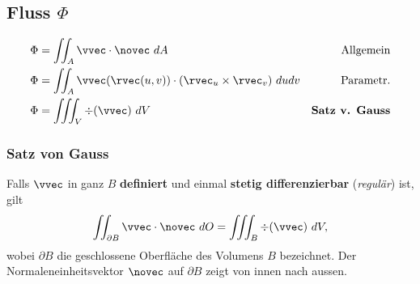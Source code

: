 \subsection{Fluss \hfill $\Phi$}
    \vspace{-1em}
    \begin{align*}
        \Phi &= \iint_A \vvec \cdot \novec \ dA &\textrm{Allgemein}\\
        \Phi &= \iint_A \vvec(\rvec(u,v)) \cdot (\rvec_u \times \rvec_v) \ du dv &\textrm{Parametr.}\\
        \Phi &= \iiint_V \div(\vvec) \ dV &\textbf{Satz\ v. Gauss}
    \end{align*}

    \subsubsection{Satz von Gauss}
        Falls $\vvec$ in ganz $B$ \textbf{definiert} und einmal \textbf{stetig differenzierbar} (\textit{regulär}) ist, gilt
        $$
            \iint_{\partial B} \vvec \cdot \novec \ dO = \iiint_B \div(\vvec) \ dV,
        $$
        wobei $\partial B$ die geschlossene Oberfläche des Volumens $B$ bezeichnet.
        Der Normaleneinheitsvektor $\novec$ auf $\partial B$ zeigt von innen nach aussen.